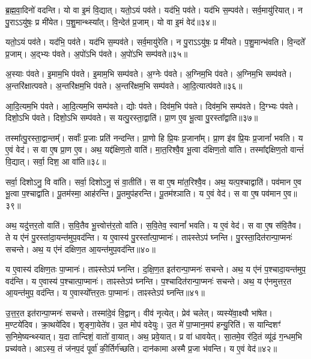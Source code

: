 ब्र॒ह्म॒वा॒दिनो॑ वदन्ति।
यो वा इ॒मं वि॒द्यात्।
यतो॒ऽयं पव॑ते।
यद॑भि॒ पव॑ते।
यद॑भि स॒म्पव॑ते।
सर्व॒मायु॑रियात्।
न पु॒रा\-ऽऽयु॑षः॒ प्र मी॑येत।
प॒शु॒मान्थ्स्या᳚त्।
वि॒न्देत॑ प्र॒जाम्।
यो वा इ॒मं वेद॑॥३४॥\ip

यतो॒ऽयं पव॑ते।
यद॑भि॒ पव॑ते।
यद॑भि स॒म्पव॑ते।
सर्व॒मायु॑रेति।
न पु॒रा\-ऽऽयु॑षः॒ प्र मी॑यते।
प॒शु॒मान्भ॑वति।
वि॒न्दते᳚ प्र॒जाम्।
अ॒द्भ्यः प॑वते।
अ॒पो॑ऽभि प॑वते।
अ॒पो॑ऽभि सम्प॑वते॥३५॥\ip

अ॒स्याः प॑वते।
इ॒माम॒भि प॑वते।
इ॒माम॒भि सम्प॑वते।
अ॒ग्नेः प॑वते।
अ॒ग्निम॒भि प॑वते।
अ॒ग्निम॒भि सम्प॑वते।
अ॒न्तरि॑क्षात्पवते।
अ॒न्तरि॑क्षम॒भि प॑वते।
अ॒न्तरि॑क्षम॒भि सम्प॑वते।
आ॒दि॒त्यात्प॑वते॥३६॥\ip

आ॒दि॒त्यम॒भि प॑वते।
आ॒दि॒त्यम॒भि सम्प॑वते।
द्योः प॑वते।
दिव॑म॒भि प॑वते।
दिव॑म॒भि सम्प॑वते।
दि॒ग्भ्यः प॑वते।
दिशो॒ऽभि प॑वते।
दिशो॒ऽभि सम्प॑वते।
स यत्पु॒रस्ता॒द्वाति॑।
प्रा॒ण ए॒व भू॒त्वा पु॒रस्ता᳚द्वाति॥३७॥\ip

तस्मा᳚त्पु॒रस्ता॒द्वान्तम्᳚।
सर्वाः᳚ प्र॒जाः प्रति॑ नन्दन्ति।
प्रा॒णो हि प्रि॒यः प्र॒जाना᳚म्।
प्रा॒ण इ॑व प्रि॒यः प्र॒जानां᳚ भवति।
य ए॒वं वेद॑।
स वा ए॒ष प्रा॒ण ए॒व।
अथ॒ यद्द॑क्षिण॒तो वाति॑।
मा॒त॒रिश्वै॒व भू॒त्वा द॑क्षिण॒तो वा॑ति।
तस्मा᳚द्दक्षिण॒तो वान्तं॑ वि॒द्यात्।
सर्वा॒ दिश॒ आ वा॑ति॥३८॥\ip

सर्वा॒ दिशोऽनु॒ वि वा॑ति।
सर्वा॒ दिशोऽनु॒ सं वा॒तीति॑।
स वा ए॒ष मा॑त॒रिश्वै॒व।
अथ॒ यत्प॒श्चाद्वाति॑।
पव॑मान ए॒व भू॒त्वा प॒श्चाद्वा॑ति।
पू॒तम॑स्मा॒ आह॑रन्ति।
पू॒तमुप॑हरन्ति।
पू॒तम॑श्ञाति।
य ए॒वं वेद॑।
स वा ए॒ष पव॑मान ए॒व॥३९॥\ip

अथ॒ यदु॑त्तर॒तो वाति॑।
स॒वि॒तैव भू॒त्त्वोत्त॑र॒तो वा॑ति।
स॒वि॒तेव॒ स्वानां᳚ भवति।
य ए॒वं वेद॑।
स वा ए॒ष स॑वि॒तैव।
ते य ए॑नं पु॒रस्ता॑दा॒यन्त॑मुप॒वद॑न्ति।
य ए॒वास्य॑ पु॒रस्ता᳚त्पा॒प्मानः॑।
ताꣴस्तेऽप॑ घ्नन्ति।
पु॒रस्ता॒दित॑रान्पा॒प्मनः॑ सचन्ते।
अथ॒ य ए॑नं दक्षिण॒त आ॒यन्त॑मुप॒वद॑न्ति॥४०॥\ip

य ए॒वास्य॑ दक्षिण॒तः पा॒प्मानः॑।
ताꣴस्तेऽप॑ घ्नन्ति।
द॒क्षि॒ण॒त इत॑रान्पा॒प्मनः॑ सचन्ते।
अथ॒ य ए॑नं प॒श्चादा॒यन्त॑मुप॒ वद॑न्ति।
य ए॒वास्य॑ प॒श्चात्पा॒प्मानः॑।
ताꣴस्तेऽप॑ घ्नन्ति।
प॒श्चादित॑रान्पा॒प्मनः॑ सचन्ते।
अथ॒ य ए॑नमुत्तर॒त आ॒यन्त॑मुप॒ वद॑न्ति।
य ए॒वास्यो᳚त्तर॒तः पा॒प्मानः॑।
ताꣴस्तेऽप॑ घ्नन्ति॥४१॥\ip

उ॒त्त॒र॒त इत॑रान्पा॒प्मनः॑ सचन्ते।
तस्मा॑दे॒वं वि॒द्वान्।
वीव॑ नृत्येत्।
प्रेव॑ चलेत्।
व्यस्ये॑वा॒क्ष्यौ भा॑षेत।
म॒ण्टये॑दिव।
क्रा॒थये॑दिव।
शृ॒ङ्गा॒येते॑व।
उ॒त मोप॑ वदेयुः।
उ॒त मे॑ पा॒प्मान॒मप॑ हन्यु॒रिति॑।
स यान्दिशꣳ॑ स॒निमे॒ष्यन्थ्स्यात्।
य॒दा तान्दिशं॒ वातो॑ वा॒यात्।
अथ॒ प्रवे॒यात्।
प्र वा॑ धावयेत्।
सा॒तमे॒व र॑दि॒तं व्यू॑ढं ग॒न्धम॒भि प्रच्य॑वते।
आऽस्य॒ तं ज॑नप॒दं पूर्वा॑ की॒र्तिर्ग॑च्छति।
दान॑कामा अस्मै प्र॒जा भ॑वन्ति।
य ए॒वं वेद॑॥४२॥\ip\anuvakamend[वेद॒ सम्प॑वत आदि॒त्यात्प॑वते वा॒त्या वा᳚त्ये॒ष पव॑मान ए॒व द॑क्षिण॒त आ॒यन्त॑मुप॒ वद॑न्त्युत्तर॒तः पा॒प्मान॒स्ताꣴ स्तेप॑ घ्न॒न्तीत्य॒ष्टौ च॑]

